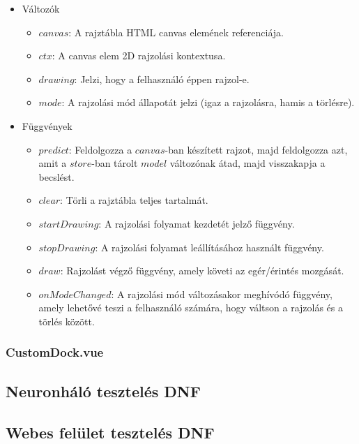 \begin{itemize}
    \item Változók
    \begin{itemize}
        \item $canvas$: A rajztábla HTML canvas elemének referenciája.
        \item $ctx$: A canvas elem 2D rajzolási kontextusa.
        \item $drawing$: Jelzi, hogy a felhasználó éppen rajzol-e.
        \item $mode$: A rajzolási mód állapotát jelzi (igaz a rajzolásra, hamis a törlésre).
    \end{itemize}
    \item Függvények
    \begin{itemize}
        \item $predict$: Feldolgozza a $canvas$-ban készített rajzot, majd feldolgozza azt, amit a $store$-ban tárolt $model$ változónak átad, majd visszakapja a becslést.
        \item $clear$: Törli a rajztábla teljes tartalmát.
        \item $startDrawing$: A rajzolási folyamat kezdetét jelző függvény.
        \item $stopDrawing$: A rajzolási folyamat leállításához használt függvény.
        \item $draw$: Rajzolást végző függvény, amely követi az egér/érintés mozgását.
        \item $onModeChanged$: A rajzolási mód változásakor meghívódó függvény, amely lehetővé teszi a felhasználó számára, hogy váltson a rajzolás és a törlés között.
    \end{itemize}
\end{itemize}

\subsubsection{CustomDock.vue}

\subsection{Neuronháló tesztelés DNF}

\subsection{Webes felület tesztelés DNF}